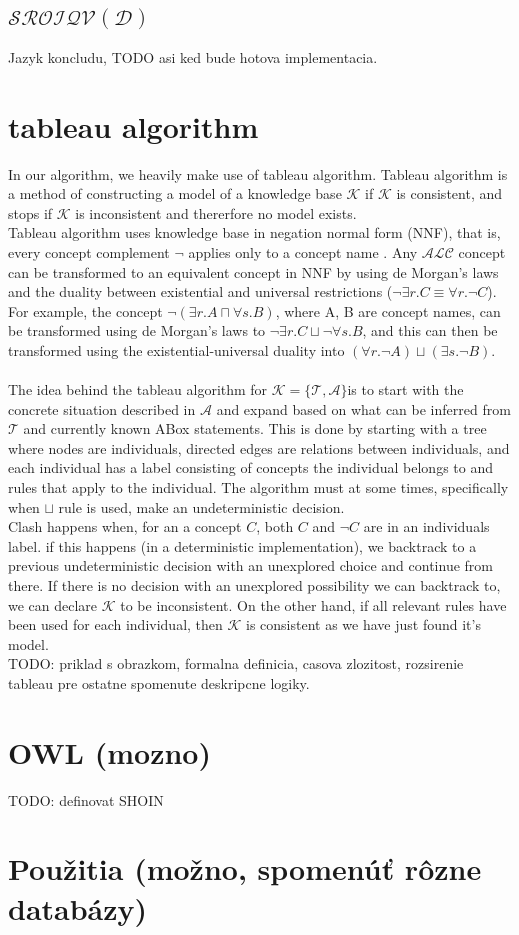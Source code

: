 \subsection{$\mathcal{SROIQV(D)}$}
Jazyk koncludu, TODO asi ked bude hotova implementacia.
\section{tableau algorithm}

In our algorithm, we heavily make use of tableau algorithm.
Tableau algorithm is a method of constructing a model of a knowledge base $\mathcal{K}$ if $\mathcal{K}$ is consistent, and stops if $\mathcal{K}$ is inconsistent and thererfore no model exists. \\ \indent
Tableau algorithm uses knowledge base in negation normal form (NNF), that is, every concept complement $\neg$ applies only to a concept name \cite{handbook2}.  Any $\mathcal{ALC}$ concept can be transformed to an equivalent concept in NNF by using de Morgan's laws and the duality between existential and universal restrictions ($\neg \exists r.C \equiv \forall r.{\neg C}$).
For example, the concept $\neg (\exists r.A \sqcap \forall s.B)$,
where A, B are concept names, can be transformed using de Morgan's laws to $\neg \exists r.C \sqcup \neg \forall s.B$, and this can then be transformed using the existential-universal duality into $(\forall r.\neg A) \sqcup (\exists s.\neg B)$.
\\ \\ 
\indent The idea behind the tableau algorithm for $\mathcal{K} = \{ \mathcal{T} , \mathcal{A} \} $is to start with the concrete situation described in $\mathcal{A}$ and expand based on what can be inferred from $\mathcal{T}$ and currently known ABox statements. This is done by starting with a tree where nodes are individuals, directed edges are relations between individuals, and each individual has a label consisting of concepts the individual belongs to and rules that apply to the individual. The algorithm must at some times, specifically when $\sqcup$  rule is used, make an undeterministic decision.
\\
\indent
Clash happens when, for an a concept $C$, both $C$ and $\neg C$ are in an individuals label. if this happens (in a deterministic implementation), we backtrack to a previous undeterministic decision with an unexplored choice and continue from there.    
If there is no decision with an unexplored possibility we can backtrack to, we can declare $\mathcal{K}$ to be inconsistent. On the other hand, if all relevant rules have been used for each individual, then $\mathcal{K}$ is consistent as we have just found it's model. \\
 TODO: priklad s obrazkom, formalna definicia, casova zlozitost, rozsirenie tableau pre ostatne spomenute deskripcne logiky.



\section{OWL (mozno)}
	TODO: definovat SHOIN
\section{Použitia  (možno, spomenúť rôzne databázy)}

